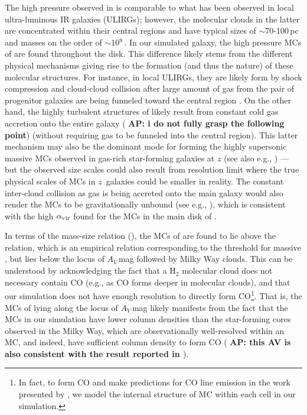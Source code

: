 \IfFileExists{emulateapjlegacy.cls}{\documentclass[iop]{emulateapjlegacy}}{\documentclass[iop]{emulateapj}}
\newcommand{\AP}[1]{({\bf \color{apcolor} AP: #1})}
\begin{document}
The high pressure observed in \flower is comparable to what has been observed in local ultra-luminous IR galaxies (ULIRGs); however, the molecular clouds in the latter are concentrated within their central regions and have typical sizes of $\sim$70-100\,pc and masses on the order of $\sim$10$^9$\,\Msun \citep{Downes98a, Sakamoto08a}. In our simulated galaxy, the high pressure MCs of \flower are found throughout the disk. This difference likely stems from the different physical mechanisms giving rise to the formation (and thus the nature) of these molecular structures.
%
For instance, in local ULIRGs, they are likely form by shock compression and cloud-cloud collision after large amount of gas from the pair of progenitor galaxies are being funneled toward the central region \citep{Tan00a, Wu18a}.
On the other hand, the highly turbulent structures of \flower likely result from constant cold gas accretion onto the entire galaxy \AP{i do not fully grasp the following point} (without requiring gas to be funneled into the central region).
This latter mechanism may also be the dominant mode for forming the highly supersonic massive MCs observed in gas-rich star-forming galaxies at $z$ (see also e.g., \citealt{Swinbank11a}) --- but the observed size scales could also result from resolution limit where the true physical scales of MCs in $z$\, galaxies could be smaller in reality.
%
The constant inter-cloud collision as gas is being accreted onto the main galaxy would also render
the MCs to be gravitationally unbound (see e.g., \citealt{Dobbs11a}), which is 
consistent with the high $\alpha_{\rm vir}$ found for the MCs in the main disk of \flower.

In terms of the mass-size relation (), the MCs of \flower are found to lie above the \citet{Kauffmann10c} relation, which is an empirical relation corresponding to the threshold for massive \SF, but lies
below the locus of $A_V$\,mag followed by Milky Way clouds. This can be understood by acknowledging the fact that a H$_2$ molecular cloud does not necessary contain CO (e.g., as CO forms deeper in molecular clouds), and that our simulation does not have enough resolution to directly form CO\footnote{In fact, to form CO and make predictions for CO line emission in the work presented by \citet{Vallini18a}, we model the internal structure of MC within each cell in our simulation.}.
%
That is, the MCs of \flower lying along the locus of $A_V$\,mag likely manifests from the fact that the MCs in our simulation have lower column densities than the star-forming cores observed in the Milky Way, which are observationally well-resolved within an MC, and indeed, have sufficient column density to form CO \AP{this AV is also consistent with the result reported in \citet{Behrens18a}}.
\end{document}

